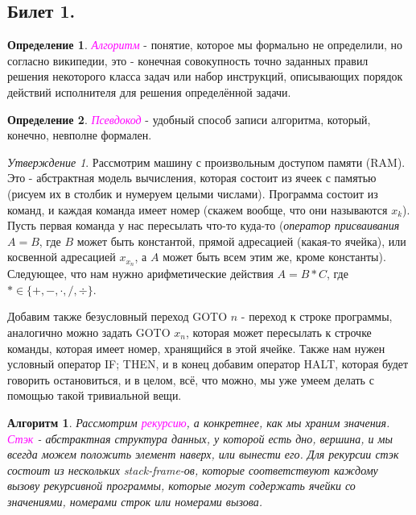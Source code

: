 \documentclass[a4paper]{article}
\theoremstyle{indented}
\newtheorem{alg}{Алгоритм}
\theoremstyle{definition}
\newtheorem{defn}{Определение}
\theoremstyle{remark}
\newtheorem{stat}{Утверждение}
\begin{document}
\subsection{Билет 1.}

\begin{defn}
    \textcolor{magenta}{\hypertarget{d-1}{\textit{Алгоритм}}} - понятие, которое мы формально не определили, но согласно википедии, это - конечная совокупность точно заданных правил решения некоторого класса задач или набор инструкций, описывающих порядок действий исполнителя для решения определённой задачи. 
\end{defn}

\begin{defn}
    \textcolor{magenta}{\hypertarget{d-2}{\textit{Псевдокод}}} - удобный способ записи алгоритма, который, конечно, невполне формален.
\end{defn}

\begin{stat}
    Рассмотрим машину с произвольным доступом памяти (RAM). Это - абстрактная модель вычисления, которая состоит из ячеек с памятью (рисуем их в столбик и нумеруем целыми числами). Программа состоит из команд, и каждая команда имеет номер (скажем вообще, что они называются $x_k$). Пусть первая команда у нас пересылать что-то куда-то (\textit{оператор присваивания} $A=B$, где $B$ может быть константой, прямой адресацией (какая-то ячейка), или косвенной адресацией $x_{x_n}$, а $A$ может быть всем этим же, кроме константы). Следующее, что нам нужно арифметические действия $A=B*C$, где $*\in\{+, -, \cdot, /, \div\}$. \ 

    Добавим также безусловный переход GOTO $n$ - переход к строке программы, аналогично можно задать GOTO $x_n$, которая может пересылать к строчке команды, которая имеет номер, хранящийся в этой ячейке. Также нам нужен условный оператор {IF; THEN}, и в конец добавим оператор HALT, которая будет говорить остановиться, и в целом, всё, что можно, мы уже умеем делать с помощью такой тривиальной вещи. \ 
\end{stat}

\begin{alg}
    Рассмотрим \textcolor{magenta}{\hypertarget{d-3}{\textit{рекурсию}}}, а конкретнее, как мы храним значения. \textcolor{magenta}{\hypertarget{d-4}{\textit{Стэк}}} - абстрактная структура данных, у которой есть дно, вершина, и мы всегда можем положить элемент наверх, или вынести его. Для рекурсии стэк состоит из нескольких stack-frame-ов, которые соответствуют каждому вызову рекурсивной программы, которые могут содержать ячейки со значениями, номерами строк или номерами вызова.
\end{alg}
\end{document}
